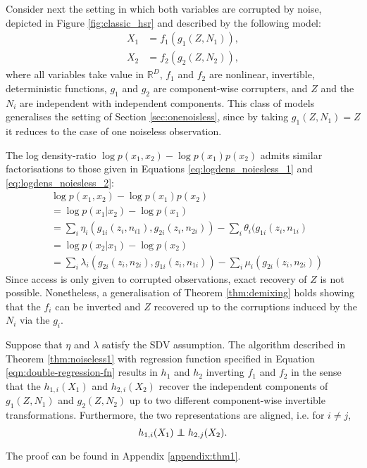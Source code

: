 Consider next the setting in which both variables are corrupted by noise, depicted in Figure \ref{fig:classic_hsr} and described by the following model:
\begin{align*}
X_{1}&={f}_{1}({g}_{1}({Z},N_{1})),  \\
X_{2}&={f}_{2}({g}_{2}({Z},N_{2})),
\end{align*}
where all variables take value in $\mathbb{R}^D$, ${f}_{1}$ and ${f}_{2}$ are nonlinear, invertible, deterministic functions,
${g}_{1}$ and ${g}_{2}$ are component-wise corrupters, and $Z$ and the $N_i$ are independent with independent components.
This class of models generalises the setting of Section \ref{sec:onenoisless}, since by taking ${g}_1(Z, N_1) = Z$ it reduces to the case of one noiseless observation.

The log density-ratio $\log p({x}_1, {x}_2) - \log p({x}_1)p({x}_2)$ admits similar factorisations to those given in Equations \ref{eq:logdens_noiesless_1} and \ref{eq:logdens_noiesless_2}:
\begin{align}
&\log p({x}_1, {x}_2) - \log p({x}_1) p({x}_2) \nonumber\\
&= \log p({x}_1 | {x}_2) - \log p({x}_1)\nonumber\\
&= \sum_i \eta_i(g_{1i}(z_i, n_{i1}), g_{2i}(z_i, n_{2i})) - \sum_i \theta_i(g_{1i}(z_i, n_{1i}) \label{eq:noisylogdens_1}\\
&= \log p({x}_2 | {x}_1) - \log p({x}_2) \nonumber\\
&= \sum_i \lambda_i(g_{2i}(z_i, n_{2i}), g_{1i}(z_i, n_{1i})) - \sum_i \mu_i(g_{2i}(z_i, n_{2i})) \label{eq:noisylogdens_2}
\end{align}
Since access is only given to corrupted observations, exact recovery of $Z$ is not possible.
Nonetheless, a generalisation of Theorem \ref{thm:demixing} holds showing that the ${f}_i$ can be inverted and $Z$ recovered up to the corruptions induced by the $N_i$ via the ${g}_i$.

\medskip

\begin{theorem}\label{thm:two-noisy-views}
	Suppose that ${\eta}$ and ${\lambda}$ satisfy the SDV assumption.
	The algorithm described in Theorem \ref{thm:noiseless1} with regression function specified in Equation \ref{eqn:double-regression-fn} results in ${h}_1$ and ${h}_2$ inverting ${f}_1$ and ${f}_2$ in the sense that the $h_{1,i}({X}_1)$ and $h_{2,i}({X}_2)$ recover the independent components of ${g}_1({Z}, {N}_1)$ and ${g}_2({Z}, {N}_2)$ up to two different component-wise invertible transformations. Furthermore, the two representations are aligned, i.e. for $i\not=j$,
	\begin{equation*}
	h_{1,i}({X}_{1})\independent h_{2,j}({X}_{2}).
	\end{equation*}
\end{theorem}
The proof can be found in Appendix \ref{appendix:thm1}.

